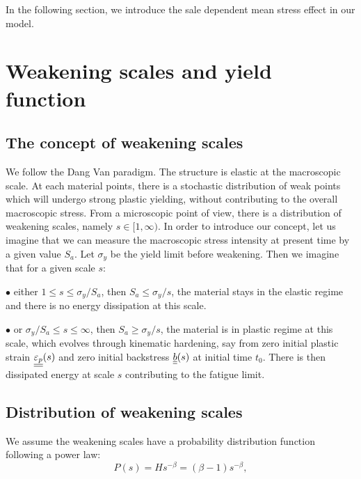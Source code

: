 In the following section, we introduce the sale dependent mean stress effect in our model.

\section{Weakening scales and yield function}
\label{sec:5.4}

\subsection{The concept of weakening scales} 
\label{sec:5.4.1}

We follow the Dang Van paradigm. The structure is elastic at the macroscopic scale. At each material points, there is a stochastic distribution of weak points which will undergo strong plastic yielding, without contributing to the overall macroscopic stress. From a microscopic point of view, there is a distribution of weakening scales, namely $s\in[1,\infty)$. In order to introduce our concept, let us imagine that we can measure the macroscopic stress intensity at present time by a given value $S_{a}$. Let $\sigma_y$ be the yield limit before weakening. Then we imagine that for a given scale $s$:

\vspace{6pt}
\noindent
$\bullet$ either $1\leqslant s\leqslant \sigma_y/S_{a}$, then $S_{a}\leqslant \sigma_y/s$, the material stays in the elastic regime and there is no energy dissipation at this scale.

\vspace{6pt}
\noindent
$\bullet$ or $\sigma_y/S_{a}\leqslant s\leqslant \infty$, then $S_{a}\geqslant \sigma_y/s$, the material is in plastic regime at this scale, which evolves through kinematic hardening, say from zero initial plastic strain $\uline{\uline{\varepsilon_p}}(s)$ and zero initial backstress $\uline{\uline{b}}(s)$ at initial time $t_0$. There is then dissipated energy at scale $s$ contributing to the fatigue limit.


\vspace{6pt}

\subsection{Distribution of weakening scales}

We assume the weakening scales have a  probability distribution function following a power law:
\begin{equation}
P(s) = Hs^{-\beta}=(\beta-1)s^{-\beta},
\label{eq.ps}
\end{equation}

